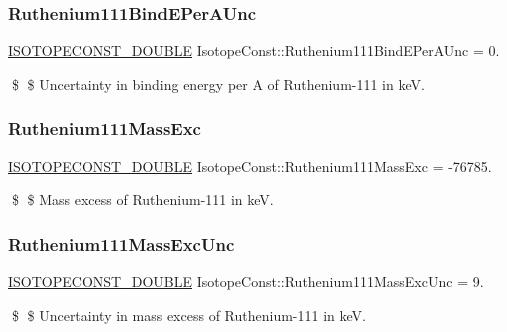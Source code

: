 \subsubsection{\texorpdfstring{Ruthenium111\+Bind\+E\+Per\+A\+Unc}{Ruthenium111BindEPerAUnc}}
{\footnotesize\ttfamily \mbox{\hyperlink{group___isotope_const-_macros_ga8f45a7272ce02c0b4c65c44636ed719a}{I\+S\+O\+T\+O\+P\+E\+C\+O\+N\+S\+T\+\_\+\+D\+O\+U\+B\+LE}} Isotope\+Const\+::\+Ruthenium111\+Bind\+E\+Per\+A\+Unc = 0.}

\$ \$ Uncertainty in binding energy per A of Ruthenium-\/111 in keV. \mbox{\label{group___isotope_const-_ruthenium-_ru111_gabf2662618e2c279df2a28a3e21eef34c}} 
\subsubsection{\texorpdfstring{Ruthenium111\+Mass\+Exc}{Ruthenium111MassExc}}
{\footnotesize\ttfamily \mbox{\hyperlink{group___isotope_const-_macros_ga8f45a7272ce02c0b4c65c44636ed719a}{I\+S\+O\+T\+O\+P\+E\+C\+O\+N\+S\+T\+\_\+\+D\+O\+U\+B\+LE}} Isotope\+Const\+::\+Ruthenium111\+Mass\+Exc = -\/76785.}

\$ \$ Mass excess of Ruthenium-\/111 in keV. \mbox{\label{group___isotope_const-_ruthenium-_ru111_gacd5e68f87ff8144d14f54958a94926cc}} 
\subsubsection{\texorpdfstring{Ruthenium111\+Mass\+Exc\+Unc}{Ruthenium111MassExcUnc}}
{\footnotesize\ttfamily \mbox{\hyperlink{group___isotope_const-_macros_ga8f45a7272ce02c0b4c65c44636ed719a}{I\+S\+O\+T\+O\+P\+E\+C\+O\+N\+S\+T\+\_\+\+D\+O\+U\+B\+LE}} Isotope\+Const\+::\+Ruthenium111\+Mass\+Exc\+Unc = 9.}

\$ \$ Uncertainty in mass excess of Ruthenium-\/111 in keV. \mbox{\label{group___isotope_const-_ruthenium-_ru111_gaa038c082008cf328249685062296a719}} 
